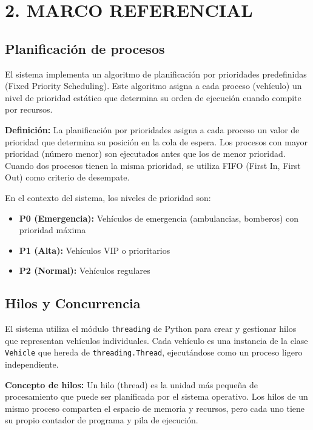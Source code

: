 \documentclass[12pt,a4paper]{article}
\begin{document}
\newpage

\section{2. MARCO REFERENCIAL}

\subsection{Planificación de procesos}

El sistema implementa un algoritmo de planificación por prioridades predefinidas (Fixed Priority Scheduling). Este algoritmo asigna a cada proceso (vehículo) un nivel de prioridad estático que determina su orden de ejecución cuando compite por recursos.

\textbf{Definición:} La planificación por prioridades asigna a cada proceso un valor de prioridad que determina su posición en la cola de espera. Los procesos con mayor prioridad (número menor) son ejecutados antes que los de menor prioridad. Cuando dos procesos tienen la misma prioridad, se utiliza FIFO (First In, First Out) como criterio de desempate.

En el contexto del sistema, los niveles de prioridad son:
\begin{itemize}
    \item \textbf{P0 (Emergencia):} Vehículos de emergencia (ambulancias, bomberos) con prioridad máxima
    \item \textbf{P1 (Alta):} Vehículos VIP o prioritarios
    \item \textbf{P2 (Normal):} Vehículos regulares
\end{itemize}

\subsection{Hilos y Concurrencia}

El sistema utiliza el módulo \texttt{threading} de Python para crear y gestionar hilos que representan vehículos individuales. Cada vehículo es una instancia de la clase \texttt{Vehicle} que hereda de \texttt{threading.Thread}, ejecutándose como un proceso ligero independiente.

\textbf{Concepto de hilos:} Un hilo (thread) es la unidad más pequeña de procesamiento que puede ser planificada por el sistema operativo. Los hilos de un mismo proceso comparten el espacio de memoria y recursos, pero cada uno tiene su propio contador de programa y pila de ejecución.
\end{document}
